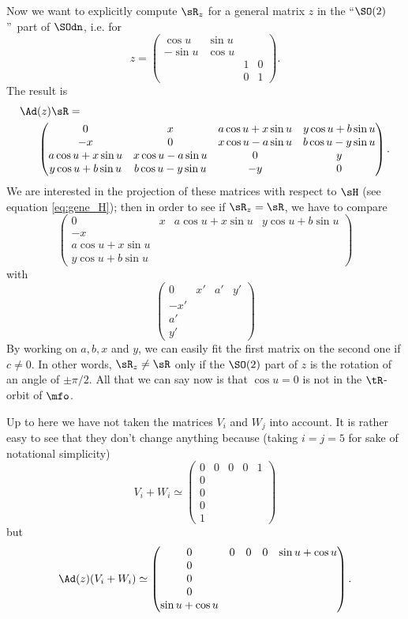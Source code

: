 Now we want to explicitly compute $\sR_z$ for a general matrix $z$ in the ``$\SO(2)$''\ part of $\SOdn$, i.e. for
\[
   z=
\begin{pmatrix}
  \cos u  & \sin u \\
  -\sin u & \cos u \\
    &  & 1  & 0\\
    &  & 0  & 1
 \end{pmatrix}.
\]
The result is 
\begin{equation}
\begin{split}
  \Ad&(z)\sR=\\
&\begin{pmatrix}
  0      & x      & a\cos u+x\sin u & y\cos u+b\sin u\\
  -x     & 0      & x\cos u-a\sin u & b\cos u-y\sin u\\
  a\cos u+x\sin u   & x\cos u -a\sin u &   0   & y\\
  y\cos u+b\sin u  & b\cos u-y\sin u &   -y  & 0
 \end{pmatrix}.   
\end{split}
\end{equation}
We are interested in the projection of these matrices with respect to $\sH$ (see equation \eqref{eq:gene_H}); then in order to see if $\sR_z=\sR$, we have to compare
\[
\begin{pmatrix}
  0      & x & a\cos u+x\sin u & y\cos u+b\sin u\\
  -x     &  &        & \\
  a\cos u+x\sin u  &  &        & \\
  y \cos u+b\sin u  &  &        & 
 \end{pmatrix}   
\]
with
\[
\begin{pmatrix}
  0  & x' & a'& y'\\
  -x' &  &  & \\
  a'  &  &  & \\
  y'  &  &  & 
 \end{pmatrix}
\]
By working on $a,b,x$ and $y$, we can easily fit the first matrix on the second
one if $c\neq 0$. In other words, $\sR_z\neq\sR$ only if the $\SO(2)$
part of $z$ is the rotation of an angle of $\pm\pi/2$. All that we can say now is that $\cos u=0$ is  not in the $\tR$-orbit of $\mfo$.

Up to here we have not taken the matrices $V_i$ and $W_j$ into account. It is rather easy to see that they don't change anything because (taking $i=j=5$ for sake of notational simplicity)
\[
  V_i+W_i\simeq
\begin{pmatrix}
0&0&0&0&1\\
0\\
0\\
0\\
1
\end{pmatrix}
\]
but
\[
  \Ad(z)(V_i+W_i)\simeq
\begin{pmatrix}
0&0&0&0&\sin u+\cos u\\
0\\
0\\
0\\
\sin u+\cos u
\end{pmatrix}.
\]

